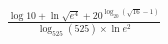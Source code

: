 \documentclass[preview]{standalone}
\begin{document}
\begin{align*}
\frac{\log10+\ln \sqrt{ e{^4} }+20^{\log_{20}(\sqrt{ 16 }-1)}}{\log_{525}(525)\times \ln e^{2}}
\end{align*}
\end{document}
